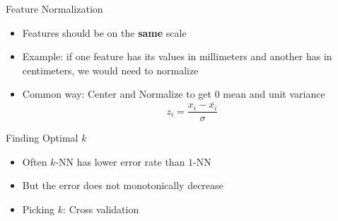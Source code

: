 \documentclass{beamer}
\begin{document}
\begin{frame}{Feature Normalization}
    \begin{itemize}
        \item Features should be on the {\bf same} scale
        \item Example: if one feature has its values in millimeters and another has in centimeters, we would need to normalize
        \item Common way: Center and Normalize to get $0$ mean and unit variance $$z_i = \frac{x_i - \overline{x_i}}{\sigma} $$
    \end{itemize}
\end{frame}


\begin{frame}{Finding Optimal $k$}
    \begin{itemize}
        \item Often $k$-NN has lower error rate than $1$-NN
        \item But the error does not monotonically decrease
        \item Picking $k$: Cross validation
    \end{itemize}
\end{frame}
\end{document}
